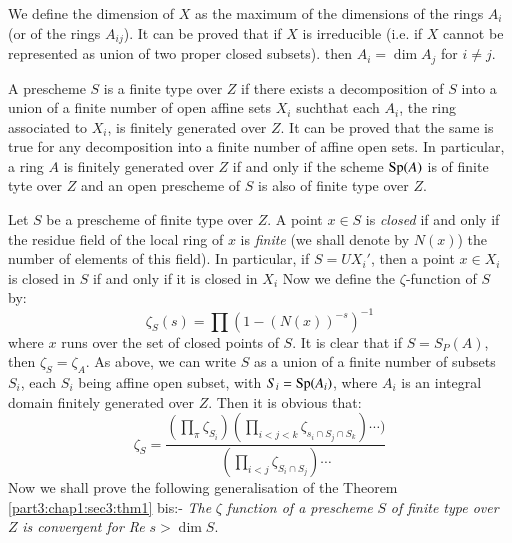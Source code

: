 We define the dimension of $X$ as the maximum of the dimensions of the
rings $A_i$(or of the rings $A_{ij}$). It can be proved that if $X$ is
irreducible (i.e. if $X$ cannot be represented as union of two proper
closed subsets). then $A_i=\dim A_j$ for $i \neq j$. 

A prescheme $S$ is a finite type over $Z$ if there exists a
decomposition of $S$ into a union of a finite number of open affine
sets $X_i$ such\pageoriginale that each $A_i$, the ring associated to $X_i$, is
finitely generated over $Z$. It can be proved that the same is true
for any decomposition into a finite number of affine open sets. In
particular, a ring $A$ is finitely generated over $Z$ if and only if
the scheme $\operatorname{Sp} (A)$ is of finite tyte over $Z$ and an open prescheme
of $S$ is also of finite type over $Z$. 

Let $S$ be a prescheme of finite type over $Z$. A point $x \in S$ is
\textit{closed} if and only if the residue field of the local ring
of $x$ is \textit{finite} (we shall denote by $N(x)$) the number of
elements of this field). In particular, if $S=U X_i'$, then a point $x
\in X_i$ is closed in $S$ if and only if it is closed in $X_i$ Now we
define the $\zeta$-function of $S$ by: 
$$
\zeta_S (s)=\prod (1-(N(x))^{-s})^{-1}
$$
where $x$ runs over the set of closed points of $S$. It is clear that
if $S=S_P(A)$, then $\zeta_S=\zeta_A$. As above, we can write $S$ as a
union of a finite number of subsets $S_i$, each $S_i$ being affine
open subset, with $S_i=\operatorname{Sp} (A_i)$, where $A_i$ is an integral domain
finitely generated over $Z$. Then it is obvious that: 
\begin{equation}
  \zeta_S=\frac{\left(\prod\limits_{\pi}\zeta_{S_i}\right)
    \left(\prod\limits_{i<j<k}\zeta_{s_i \cap S_j \cap
      S_k}\right)\cdots)}{\left(\prod\limits_{i<j} \zeta_{S_i \cap 
      S_j}\right)\cdots} \tag{I}\label{part3:chap2:sec4:eqI} 
\end{equation}
Now we shall prove the following generalisation of the
Theorem \ref{part3:chap1:sec3:thm1} 
bis:- \textit{ The } $\zeta$ \textit{ function of a prescheme } $S$
\textit{of finite type over } $Z$ \textit{is convergent for Re}
$s>\dim S$. 

